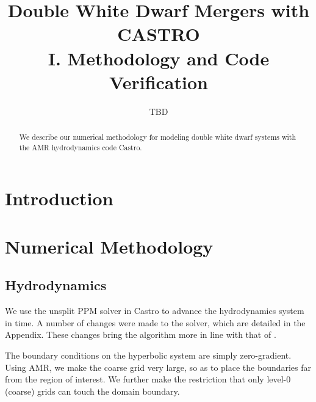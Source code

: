 \documentclass[12pt,preprint]{aastex}
\begin{document}
\title{Double White Dwarf Mergers with CASTRO\\ I. Methodology and Code 
       Verification}


\author{TBD}
\begin{abstract}
We describe our numerical methodology for modeling double white dwarf
systems with the AMR hydrodynamics code Castro.

\end{abstract}

\section{Introduction}



\section{Numerical Methodology}\label{sec:Numerical Methodology}

\subsection{Hydrodynamics}

We use the unsplit PPM solver in Castro to advance the hydrodynamics
system in time.  A number of changes were made to the solver, which are 
detailed in the Appendix.  These changes bring the algorithm more in 
line with that of \cite{ppm}.  

The boundary conditions on the hyperbolic system are simply
zero-gradient.  Using AMR, we make the coarse grid very large, so as
to place the boundaries far from the region of interest.  We further
make the restriction that only level-0 (coarse) grids can touch the
domain boundary.
\end{document}
